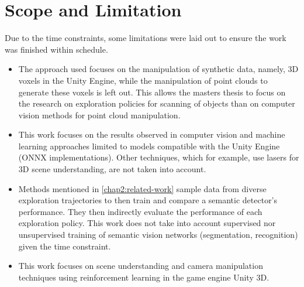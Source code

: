 \section{Scope and Limitation}\label{chap:1:scope}
Due to the time constraints, some limitations were laid out to ensure the work was finished within schedule.
\begin{itemize}
    \item The approach used focuses on the manipulation of synthetic data, namely, 3D voxels in the Unity Engine, while the manipulation of point clouds to generate these voxels is left out. This allows the masters thesis to focus on the research on exploration policies for scanning of objects than on computer vision methods for point cloud manipulation.
    \item This work focuses on the results observed in computer vision and machine learning approaches limited to models compatible with the Unity Engine (ONNX implementations). Other techniques, which for example, use lasers for 3D scene understanding, are not taken into account.
    \item Methods mentioned in \ref{chap2:related-work} sample data from diverse exploration trajectories to then train and compare a semantic detector's performance. They then indirectly evaluate the performance of each exploration policy. This work does not take into account supervised nor unsupervised training of semantic vision networks (segmentation, recognition) given the time constraint. 
    \item This work focuses on scene understanding and camera manipulation techniques using reinforcement learning in the game engine Unity 3D.
\end{itemize}
